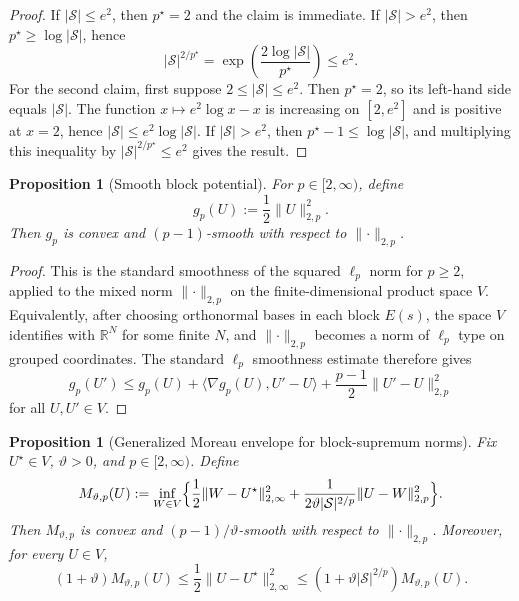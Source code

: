 \documentclass{article}
\newtheorem{proposition}[theorem]{Proposition}
\newcommand{\X}{\mathcal{S}}
\begin{document}
\begin{proof}
If $\lvert \X \rvert\le e^2$, then $p^\star=2$ and the claim is immediate. If $\lvert \X \rvert>e^2$, then $p^\star\ge \log \lvert \X \rvert$, hence
\begin{equation}
\lvert \X \rvert^{2/p^\star} = \exp\left(\frac{2\log\lvert \X \rvert}{p^\star}\right) \le e^2.
\end{equation}
For the second claim, first suppose $2\le\lvert \X\rvert\le e^2$. Then $p^\star=2$, so its left-hand side equals $\lvert \X\rvert$. The function $x\mapsto e^2\log x-x$ is increasing on $[2,e^2]$ and is positive at $x=2$, hence $\lvert \X\rvert\le e^2\log\lvert \X\rvert$. If $\lvert \X\rvert>e^2$, then $p^\star-1\le\log\lvert \X\rvert$, and multiplying this inequality by $\lvert \X\rvert^{2/p^\star}\le e^2$ gives the result.
\end{proof}

\begin{proposition}[Smooth block potential]
\label{prop:block-smooth-potential}
For $p\in[2,\infty)$, define
\begin{equation}
g_p(U) := \frac{1}{2}\lVert U \rVert_{2,p}^2.
\end{equation}
Then $g_p$ is convex and $(p-1)$-smooth \citep{beck2017first} with respect to $\lVert \cdot \rVert_{2,p}$.
\end{proposition}

\begin{proof}
This is the standard smoothness of the squared $\ell_p$ norm for $p\ge 2$, applied to the mixed norm $\lVert \cdot \rVert_{2,p}$ on the finite-dimensional product space $V$. Equivalently, after choosing orthonormal bases in each block $E(s)$, the space $V$ identifies with $\mathbb R^N$ for some finite $N$, and $\lVert \cdot \rVert_{2,p}$ becomes a norm of $\ell_p$ type on grouped coordinates. The standard $\ell_p$ smoothness estimate therefore gives
\begin{equation}
g_p(U') \le g_p(U) + \langle \nabla g_p(U), U'-U\rangle + \frac{p-1}{2}\lVert U'-U \rVert_{2,p}^2
\end{equation}
for all $U,U'\in V$.
\end{proof}

\begin{proposition}[Generalized Moreau envelope \citep{moreau1965proximite, bauschke2017convex} for block-supremum norms]
\label{prop:moreau-envelope}
Fix $U^\star\in V$, $\vartheta>0$, and $p\in[2,\infty)$. Define
\begin{equation}
M_{\vartheta,p}(U) := \inf_{W\in V}\Bigl\{\frac{1}{2}\lVert W-U^\star \rVert_{2,\infty}^2 + \frac{1}{2\vartheta\lvert\X\rvert^{2/p}}\lVert U-W \rVert_{2,p}^2\Bigr\}.
\end{equation}
Then $M_{\vartheta,p}$ is convex and $(p-1)/\vartheta$-smooth with respect to $\lVert \cdot \rVert_{2,p}$. Moreover, for every $U\in V$,
\begin{equation}
(1+\vartheta)M_{\vartheta,p}(U) \le \frac{1}{2}\lVert U-U^\star \rVert_{2,\infty}^2 \le (1+\vartheta \lvert \X \rvert^{2/p})M_{\vartheta,p}(U).
\end{equation}
\end{proposition}
\end{document}
